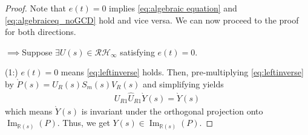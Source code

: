 \documentclass[journal]{IEEEtran}
\theoremstyle{remark}
\DeclareMathOperator*{\im}{Im}
\begin{document}
\begin{proof}
Note that $e(t)=0$ implies \eqref{eq:algebraic equation} and \eqref{eq:algebraiceq_noGCD} hold and vice versa. We can now proceed to the proof for both directions.

$\implies$Suppose $\exists U(s) \in \mathcal{R}\mathcal{H}_\infty$ satisfying $e(t)=0$.

(1:) $e(t)=0$ means \eqref{eq:leftinverse} holds. Then, pre-multiplying \eqref{eq:leftinverse} by $ \grave{P}(s) = U_R(s)S_m(s)V_R(s)$ and simplifying yields
\begin{align} \label{eq:Y invaiance}
    U_{R1}\hat{U}_{R1}\grave{Y}(s)=\grave{Y}(s)
\end{align}
which means $\grave{Y}(s)$ is invariant under the orthogonal projection onto $\im_{\mathbb{R}(s)}(P)$. Thus, we get $Y(s) \in \im_{\mathbb{R}(s)}(P)$.


\end{proof}
\end{document}
